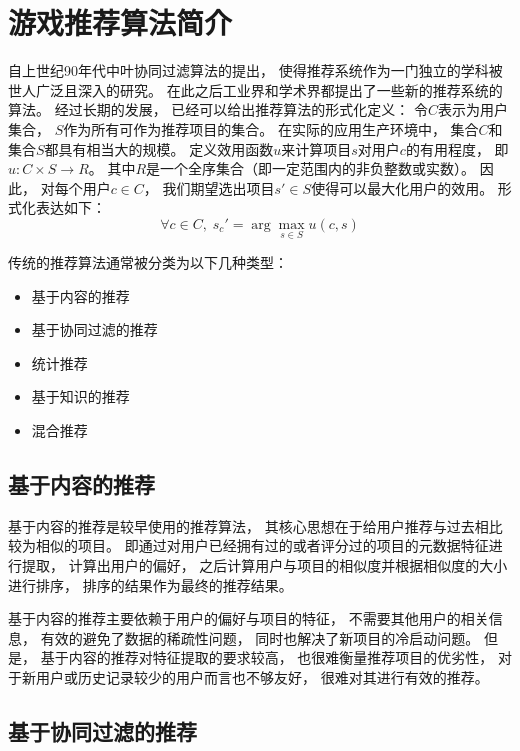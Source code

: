 \section{游戏推荐算法简介}

自上世纪90年代中叶协同过滤算法的提出\cite{adomaviciusNextGenerationRecommender2005}，
使得推荐系统作为一门独立的学科被世人广泛且深入的研究。
在此之后工业界和学术界都提出了一些新的推荐系统的算法。
经过长期的发展，
已经可以给出推荐算法的形式化定义：
令$C$表示为用户集合，
$S$作为所有可作为推荐项目的集合。
在实际的应用生产环境中，
集合$C$和集合$S$都具有相当大的规模。
定义效用函数$u$来计算项目$s$对用户$c$的有用程度，
即$u:C\times S\rightarrow R$。
其中$R$是一个全序集合（即一定范围内的非负整数或实数）。
因此，
对每个用户$c\in C$，
我们期望选出项目$s'\in S$使得可以最大化用户的效用。
形式化表达如下：
\begin{equation}
    \forall c\in C,\; s_c'=\arg \max_{s\in S} u(c,s)
\end{equation}

传统的推荐算法通常被分类为以下几种类型\cite{canoHybridRecommenderSystems2017}：
\begin{itemize}
    \item 基于内容的推荐
    \item 基于协同过滤的推荐
    \item 统计推荐
    \item 基于知识的推荐
    \item 混合推荐
\end{itemize}

\subsection{基于内容的推荐}

基于内容的推荐是较早使用的推荐算法，
其核心思想在于给用户推荐与过去相比较为相似的项目。
即通过对用户已经拥有过的或者评分过的项目的元数据特征进行提取，
计算出用户的偏好，
之后计算用户与项目的相似度并根据相似度的大小进行排序，
排序的结果作为最终的推荐结果。

基于内容的推荐主要依赖于用户的偏好与项目的特征，
不需要其他用户的相关信息，
有效的避免了数据的稀疏性问题，
同时也解决了新项目的冷启动问题。
但是，
基于内容的推荐对特征提取的要求较高，
也很难衡量推荐项目的优劣性，
对于新用户或历史记录较少的用户而言也不够友好，
很难对其进行有效的推荐。

\subsection{基于协同过滤的推荐}

